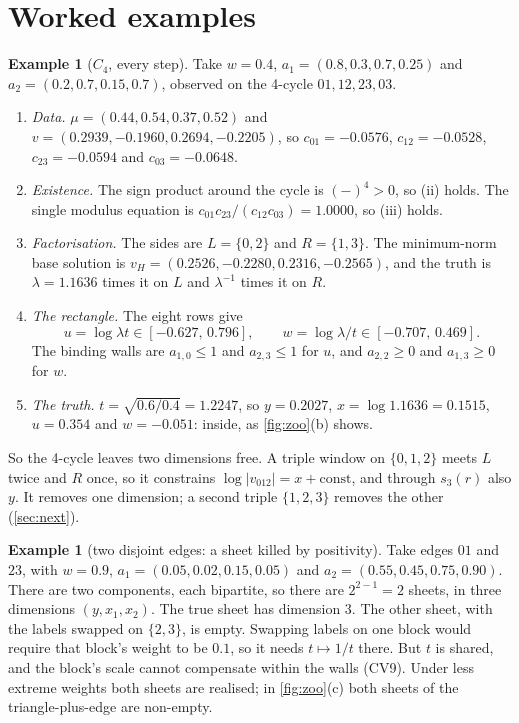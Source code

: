 \documentclass[11pt]{article}
\theoremstyle{definition}\newtheorem{definition}[theorem]{Definition}\newtheorem{remark}[theorem]{Remark}\newtheorem{example}[theorem]{Example}
\begin{document}
\section{Worked examples}\label{sec:worked}
\begin{example}[$C_4$, every step]\label{ex:c4}
Take $w=0.4$, $a_1=(0.8,0.3,0.7,0.25)$ and $a_2=(0.2,0.7,0.15,0.7)$, observed on the 4-cycle $01,12,23,03$.
\begin{enumerate}
\item \emph{Data.} $\mu=(0.44,0.54,0.37,0.52)$ and $v=(0.2939,-0.1960,0.2694,-0.2205)$, so
  $c_{01}=-0.0576$, $c_{12}=-0.0528$, $c_{23}=-0.0594$ and $c_{03}=-0.0648$.
\item \emph{Existence.} The sign product around the cycle is $(-)^4>0$, so (ii) holds. The single modulus equation is
  $c_{01}c_{23}/(c_{12}c_{03})=1.0000$, so (iii) holds.
\item \emph{Factorisation.} The sides are $L=\{0,2\}$ and $R=\{1,3\}$. The minimum-norm base solution is
  $v_H=(0.2526,-0.2280,0.2316,-0.2565)$, and the truth is $\lambda=1.1636$ times it on $L$ and $\lambda^{-1}$ times it on $R$.
\item \emph{The rectangle.} The eight rows give
\[
u=\log\lambda t\in[-0.627,\,0.796],\qquad w=\log\lambda/t\in[-0.707,\,0.469].
\]
  The binding walls are $a_{1,0}\le1$ and $a_{2,3}\le1$ for $u$, and $a_{2,2}\ge0$ and $a_{1,3}\ge0$ for $w$.
\item \emph{The truth.} $t=\sqrt{0.6/0.4}=1.2247$, so $y=0.2027$, $x=\log1.1636=0.1515$, $u=0.354$ and $w=-0.051$: inside, as
  \cref{fig:zoo}(b) shows.
\end{enumerate}
So the 4-cycle leaves two dimensions free. A triple window on $\{0,1,2\}$ meets $L$ twice and $R$ once, so it constrains
$\log|v_{012}|=x+\text{const}$, and through $s_3(r)$ also $y$. It removes one dimension; a second triple $\{1,2,3\}$ removes the
other (\cref{sec:next}).
\end{example}

\begin{example}[two disjoint edges: a sheet killed by positivity]\label{ex:kill}
Take edges $01$ and $23$, with $w=0.9$, $a_1=(0.05,0.02,0.15,0.05)$ and $a_2=(0.55,0.45,0.75,0.90)$. There are two components, each
bipartite, so there are $2^{2-1}=2$ sheets, in three dimensions $(y,x_1,x_2)$. The true sheet has dimension $3$. The other sheet, with the
labels swapped on $\{2,3\}$, is empty. Swapping labels on one block would require that block's weight to be $0.1$, so it needs
$t\mapsto1/t$ there. But $t$ is shared, and the block's scale cannot compensate within the walls (CV9). Under less extreme weights both
sheets are realised; in \cref{fig:zoo}(c) both sheets of the triangle-plus-edge are non-empty.
\end{example}
\end{document}
